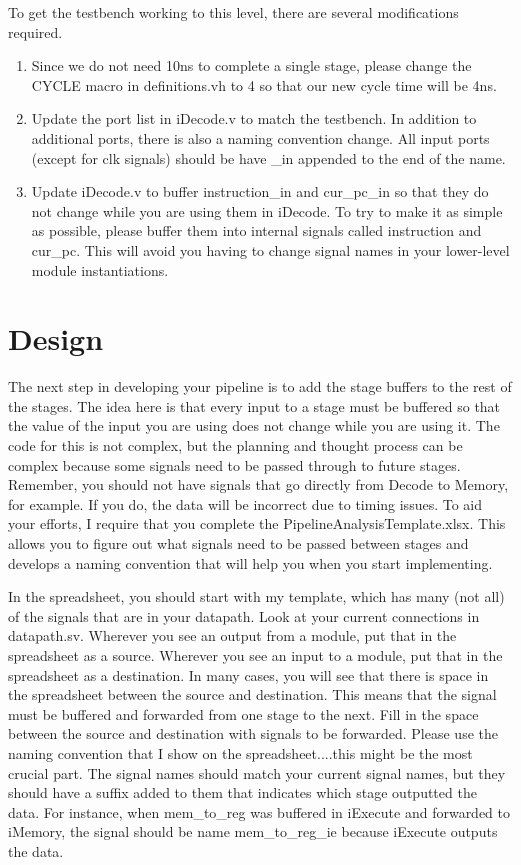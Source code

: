 To get the testbench working to this level, there are several modifications required.
\begin{enumerate}
	\item Since we do not need 10ns to complete a single stage, please change the CYCLE macro in definitions.vh to 4 so that our new cycle time will be 4ns.  
	\item Update the port list in iDecode.v to match the testbench.  In addition to additional ports, there is also a naming convention change.  All input ports (except for clk signals) should be have \_in appended to the end of the name.
	\item Update iDecode.v to buffer instruction\_in and cur\_pc\_in so that they do not change while you are using them in iDecode.  To try to make it as simple as possible, please buffer them into internal signals called instruction and cur\_pc.  This will avoid you having to change signal names in your lower-level module instantiations.
\end{enumerate}


\section{Design}
The next step in developing your pipeline is to add the stage buffers to the rest of the stages.  The idea here is that every input to a stage must be buffered so that the value of the input you are using does not change while you are using it.  The code for this is not complex, but the planning and thought process can be complex because some signals need to be passed through to future stages.  Remember, you should not have signals that go directly from Decode to Memory, for example.  If you do, the data will be incorrect due to timing issues.  To aid your efforts, I require that you complete the PipelineAnalysisTemplate.xlsx.  This allows you to figure out what signals need to be passed between stages and develops a naming convention that will help you when you start implementing. 

In the spreadsheet, you should start with my template, which has many (not all) of the signals that are in your datapath.  Look at your current connections in datapath.sv.  Wherever you see an output from a module, put that in the spreadsheet as a source.  Wherever you see an input to a module, put that in the spreadsheet as a destination.  In many cases, you will see that there is space in the spreadsheet between the source and destination.  This means that the signal must be buffered and forwarded from one stage to the next.  Fill in the space between the source and destination with signals to be forwarded.  Please use the naming convention that I show on the spreadsheet....this might be the most crucial part.  The signal names should match your current signal names, but they should have a suffix added to them that indicates which stage outputted the data.  For instance, when mem\_to\_reg was buffered in iExecute and forwarded to iMemory, the signal should be name mem\_to\_reg\_ie because iExecute outputs the data. 


